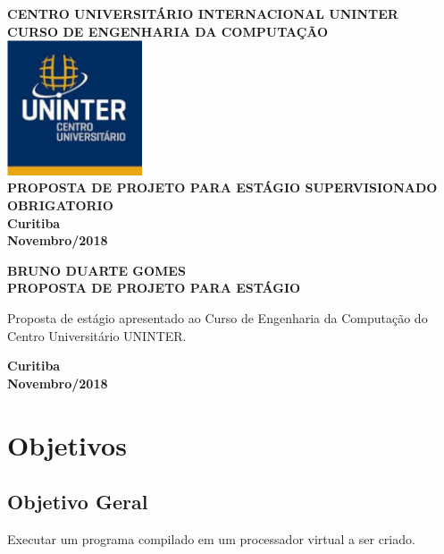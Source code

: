 \documentclass[12pt]{report}
\begin{document}
\begin{titlepage}
  \begin{center}
    \textbf{CENTRO UNIVERSITÁRIO INTERNACIONAL UNINTER}\\
    \textbf{\uppercase{Curso de Engenharia da Computação}}\\
    \vspace{3cm}
    \includegraphics[width=0.3\textwidth]{u.png}\\
    \vspace{2cm}
    \textbf{PROPOSTA DE PROJETO PARA ESTÁGIO SUPERVISIONADO OBRIGATORIO}\\
    \vfill
    \textbf{Curitiba\\Novembro/2018}
  \end{center}
\end{titlepage}

\begin{center}
  \textbf{BRUNO DUARTE GOMES}\\
  \vspace{10cm}
  \textbf{PROPOSTA DE PROJETO PARA ESTÁGIO}\\
  \vspace{.5cm}
  \begin{minipage}{0.45\textwidth}
  \end{minipage}%
  \hfill
  \begin{minipage}{0.45\textwidth}
      Proposta de estágio apresentado ao Curso de Engenharia da Computação do Centro Universitário UNINTER.
  \end{minipage}
  \vfill
  \textbf{Curitiba\\Novembro/2018}
\end{center}


\tableofcontents


\chapter{Objetivos}
\section{Objetivo Geral}
Executar um programa compilado em um processador virtual a ser criado.
\end{document}
